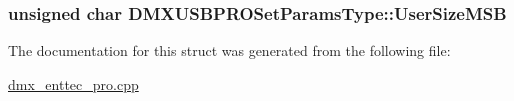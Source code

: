 \hypertarget{struct_d_m_x_u_s_b_p_r_o_set_params_type_adae7671559ec6924d03fd27f50d6fda0}{
\subsubsection[{User\-Size\-M\-S\-B}]{\setlength{\rightskip}{0pt plus 5cm}unsigned char D\-M\-X\-U\-S\-B\-P\-R\-O\-Set\-Params\-Type\-::\-User\-Size\-M\-S\-B}}\label{struct_d_m_x_u_s_b_p_r_o_set_params_type_adae7671559ec6924d03fd27f50d6fda0}


The documentation for this struct was generated from the following file\-:\begin{DoxyCompactItemize}
\item 
\hyperlink{dmx__enttec__pro_8cpp}{dmx\-\_\-enttec\-\_\-pro.\-cpp}\end{DoxyCompactItemize}
